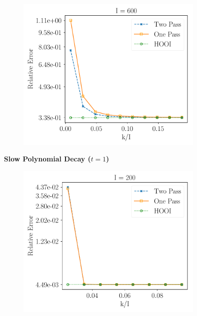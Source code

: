 \begin{figure}[H]
\begin{subfigure}{0.32\textwidth}
    \includegraphics[scale = 0.3]{figure/spd_n600.pdf}
    \end{subfigure}
\textbf{Slow Polynomial Decay ($t = 1$)}\\
    \centering 
    \begin{subfigure}{0.32\textwidth}
    \includegraphics[scale = 0.3]{figure/fed_n200.pdf}
    \end{subfigure}
    \begin{subfigure}{0.32\textwidth}

\end{subfigure}
\end{figure}
